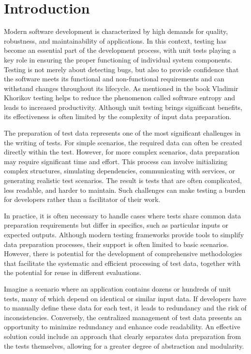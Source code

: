 
\chapter{Introduction\label{chap:introduction}}

Modern software development is characterized by high demands for quality, robustness, and maintainability of applications. In this context, testing has become an essential part of the development process, with unit tests playing a key role in ensuring the proper functioning of individual system components. Testing is not merely about detecting bugs, but also to provide confidence that the software meets its functional and non-functional requirements and can withstand changes throughout its lifecycle. As mentioned in the book \cite{Khorikov2020Jan} Vladimir Khorikov testing helps to reduce the phenomenon called software entropy and leads to increased productivity. Although unit testing brings significant benefits, its effectiveness is often limited by the complexity of input data preparation.

The preparation of test data represents one of the most significant challenges in the writing of tests. For simple scenarios, the required data can often be created directly within the test. However, for more complex scenarios, data preparation may require significant time and effort\cite{Meszaros2007Jan}. This process can involve initializing complex structures, simulating dependencies, communicating with services, or generating realistic test scenarios. The result is tests that are often complicated, less readable, and harder to maintain. Such challenges can make testing a burden for developers rather than a facilitator of their work.

In practice, it is often necessary to handle cases where tests share common data preparation requirements but differ in specifics, such as particular inputs or expected outputs. Although modern testing frameworks provide tools to simplify data preparation processes, their support is often limited to basic scenarios. However, there is potential for the development of comprehensive methodologies that facilitate the systematic and efficient processing of test data, together with the potential for reuse in different evaluations.

Imagine a scenario where an application contains dozens or hundreds of unit tests, many of which depend on identical or similar input data. If developers have to manually define these data for each test, it leads to redundancy and the risk of inconsistencies. Conversely, the centralized management of test data presents an opportunity to minimize redundancy and enhance code readability. An effective solution could include an approach that clearly separates data preparation from the tests themselves, allowing for a greater degree of abstraction and modularity.

